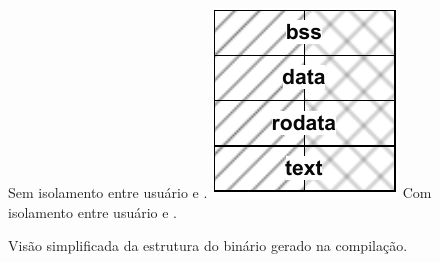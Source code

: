 \begin{figure}[tb]
	\centering
	
    \caption{Visão simplificada da estrutura do binário gerado na compilação.}%
                   {Sem isolamento entre usuário e .}
                   {\vspace{39mm}\includegraphics[width=\textwidth]{content/images/binary-structure-original.pdf}}
	\qquad
                   {Com isolamento entre usuário e .}

\end{figure}
